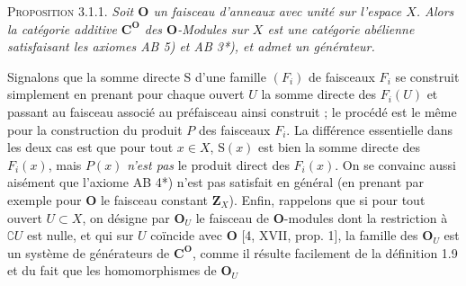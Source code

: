 \textsc{Proposition 3.1.1.} \textit{Soit $\mathbf O$ un faisceau d'anneaux
avec unité sur l'espace $X$. Alors la catégorie additive $\mathbf C^{\mathbf O}$ des
$\mathbf O$-Modules sur $X$ est une catégorie abélienne satisfaisant les
axiomes \textup{AB 5)} et \textup{AB 3*)}, et admet un générateur.}

Signalons que la somme directe $\mathrm S$ d'une famille $(F_i)$ de faisceaux $F_i$ se
construit simplement en prenant pour chaque ouvert $U$ la somme directe des
$F_i(U)$ et passant au faisceau associé au préfaisceau ainsi construit ; le
procédé est le même pour la construction du produit $P$ des faisceaux $F_i$.
La différence essentielle dans les deux cas est que pour tout $x\in X$,
$\mathrm S(x)$ est bien la somme directe des $F_i(x)$, mais $P(x)$ \textit{n'est pas} le
produit direct des $F_i(x)$. On se convainc aussi aisément que l'axiome
AB 4*) n'est pas satisfait en général (en prenant par exemple pour
$\mathbf O$ le faisceau constant $\mathbf Z_X$). Enfin, rappelons que si pour
tout ouvert $U\subset X$, on désigne par $\mathbf O_U$ le faisceau de
$\mathbf O$-modules dont la restriction à $\complement U$ est nulle, et qui sur $U$
coïncide avec $\mathbf O$ [4, XVII, prop. 1], la famille des $\mathbf O_U$ est
un système de générateurs de $\mathbf C^{\mathbf O}$, comme il résulte facilement de
la définition 1.9 et du fait que les homomorphismes de $\mathbf O_U$


